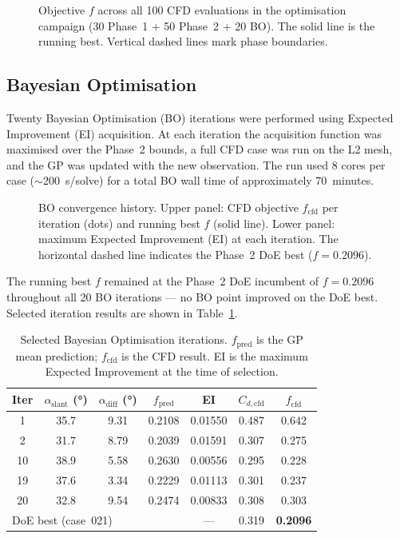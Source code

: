 \begin{figure}[h]
  \centering
  \caption{Objective $f$ across all 100 CFD evaluations in the optimisation campaign (30 Phase~1 + 50 Phase~2 + 20 BO). The solid line is the running best. Vertical dashed lines mark phase boundaries.}
  \label{fig:campaign}
\end{figure}

\subsection{Bayesian Optimisation}
\label{sec:bo_results}

Twenty Bayesian Optimisation (BO) iterations were performed using Expected Improvement (EI) acquisition. At each iteration the acquisition function was maximised over the Phase~2 bounds, a full CFD case was run on the L2 mesh, and the GP was updated with the new observation. The run used 8 cores per case ($\sim$200~s/solve) for a total BO wall time of approximately 70~minutes.

\begin{figure}[h]
  \centering
  \caption{BO convergence history. Upper panel: CFD objective $f_\mathrm{cfd}$ per iteration (dots) and running best $f$ (solid line). Lower panel: maximum Expected Improvement (EI) at each iteration. The horizontal dashed line indicates the Phase~2 DoE best ($f=0.2096$).}
  \label{fig:bo_convergence}
\end{figure}

The running best $f$ remained at the Phase~2 DoE incumbent of $f = 0.2096$ throughout all 20 BO iterations — no BO point improved on the DoE best. Selected iteration results are shown in Table~\ref{tab:bo_iterations}.

\begin{table}[h]
  \centering
  \caption{Selected Bayesian Optimisation iterations. $f_\mathrm{pred}$ is the GP mean prediction; $f_\mathrm{cfd}$ is the CFD result. EI is the maximum Expected Improvement at the time of selection.}
  \label{tab:bo_iterations}
  \begin{tabular}{ccccccc}
    \toprule
    Iter & $\alpha_\mathrm{slant}$ (°) & $\alpha_\mathrm{diff}$ (°) & $f_\mathrm{pred}$ & EI & $C_{d,\mathrm{cfd}}$ & $f_\mathrm{cfd}$ \\
    \midrule
     1 & 35.7 &  9.31 & 0.2108 & 0.01550 & 0.487 & 0.642 \\
     2 & 31.7 &  8.79 & 0.2039 & 0.01591 & 0.307 & 0.275 \\
    10 & 38.9 &  5.58 & 0.2630 & 0.00556 & 0.295 & 0.228 \\
    19 & 37.6 &  3.34 & 0.2229 & 0.01113 & 0.301 & 0.237 \\
    20 & 32.8 &  9.54 & 0.2474 & 0.00833 & 0.308 & 0.303 \\
    \midrule
    \multicolumn{4}{l}{DoE best (case~021)} & --- & 0.319 & \textbf{0.2096} \\
    \bottomrule
  \end{tabular}
\end{table}

